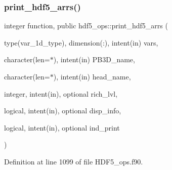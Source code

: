 \subsubsection{\texorpdfstring{print\+\_\+hdf5\+\_\+arrs()}{print\_hdf5\_arrs()}}
{\footnotesize\ttfamily integer function, public hdf5\+\_\+ops\+::print\+\_\+hdf5\+\_\+arrs (\begin{DoxyParamCaption}\item[{type(var\+\_\+1d\+\_\+type), dimension(\+:), intent(in)}]{vars,  }\item[{character(len=$\ast$), intent(in)}]{P\+B3\+D\+\_\+name,  }\item[{character(len=$\ast$), intent(in)}]{head\+\_\+name,  }\item[{integer, intent(in), optional}]{rich\+\_\+lvl,  }\item[{logical, intent(in), optional}]{disp\+\_\+info,  }\item[{logical, intent(in), optional}]{ind\+\_\+print }\end{DoxyParamCaption})}



Definition at line 1099 of file H\+D\+F5\+\_\+ops.\+f90.

